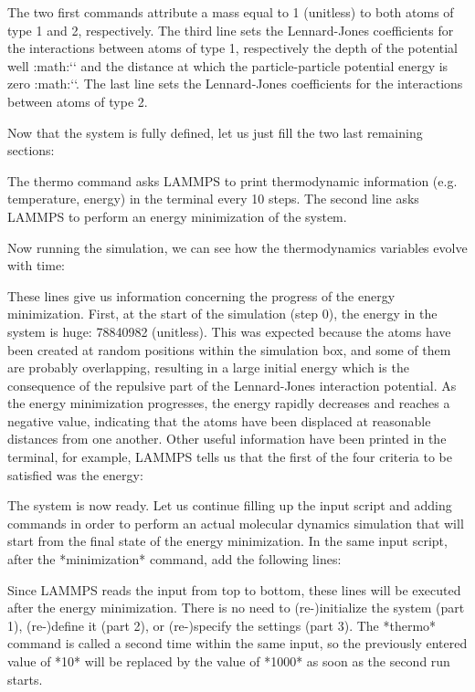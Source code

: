 The two first commands attribute a mass
equal to 1 (unitless) to both atoms of type 1 and 2,
respectively. The third line sets the Lennard-Jones
coefficients for the interactions between atoms of type 1,
respectively the depth of the potential well
:math:`\epsilon` and the distance at which the
particle-particle potential energy is zero :math:`\sigma`. 
The last line sets the Lennard-Jones coefficients for
the interactions between atoms of type 2.


Now that the system is fully defined, let us just fill the two last remaining sections:

The thermo command asks LAMMPS to print
thermodynamic information (e.g. temperature, energy) in the
terminal every 10 steps. The second line asks LAMMPS to
perform an energy minimization of the system.


Now running the simulation, we can see how the thermodynamics
variables evolve with time:

These lines give us information concerning
the progress of the energy minimization. First, at the start
of the simulation (step 0), the energy in the system is
huge: 78840982 (unitless). This was expected because
the atoms have been created at random positions within the
simulation box, and some of them are probably overlapping,
resulting in a large initial energy which is the consequence
of the repulsive part of the Lennard-Jones interaction
potential. As the energy minimization progresses, the energy
rapidly decreases and reaches a negative value, indicating that the atoms have been
displaced at reasonable distances from one another. Other
useful information have been printed in the terminal, for
example, LAMMPS tells us that the first of the four criteria
to be satisfied was the energy:


The system is now ready. Let us continue filling up the
input script and adding commands in order to perform an actual molecular dynamics
simulation that will start from the final state of the energy minimization.
In the same input script, after the *minimization* command, add the following
lines:

Since LAMMPS reads the input from top to
bottom, these lines will be executed after the energy
minimization. There is no need to (re-)initialize the system
(part 1), (re-)define it (part 2), or (re-)specify the settings
(part 3). The *thermo* command is called a second time within the 
same input, so the previously entered value of *10* will be replaced
by the value of *1000* as soon as the second run starts.

